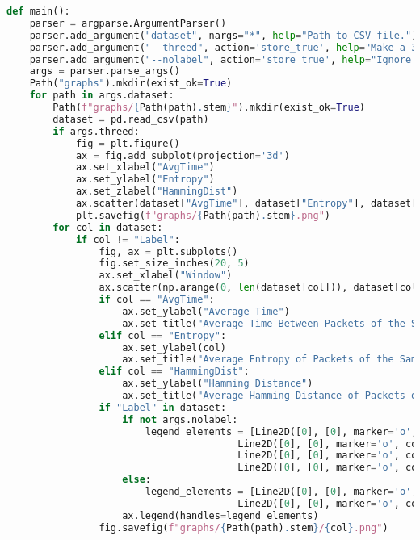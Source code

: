 \begin{lstlisting}[language=Python]
def main():
    parser = argparse.ArgumentParser()
    parser.add_argument("dataset", nargs="*", help="Path to CSV file.")
    parser.add_argument("--threed", action='store_true', help="Make a 3d scatterplot.")
    parser.add_argument("--nolabel", action='store_true', help="Ignore labels.")
    args = parser.parse_args()
    Path("graphs").mkdir(exist_ok=True)
    for path in args.dataset:
        Path(f"graphs/{Path(path).stem}").mkdir(exist_ok=True)
        dataset = pd.read_csv(path)
        if args.threed:
            fig = plt.figure()
            ax = fig.add_subplot(projection='3d')
            ax.set_xlabel("AvgTime")
            ax.set_ylabel("Entropy")
            ax.set_zlabel("HammingDist")
            ax.scatter(dataset["AvgTime"], dataset["Entropy"], dataset["HammingDist"], c = dataset["Label"].apply(label_to_color_alt if args.nolabel else label_to_color).values if "Label" in dataset else "c")
            plt.savefig(f"graphs/{Path(path).stem}.png")
        for col in dataset:
            if col != "Label":
                fig, ax = plt.subplots()
                fig.set_size_inches(20, 5)
                ax.set_xlabel("Window")
                ax.scatter(np.arange(0, len(dataset[col])), dataset[col], c = dataset["Label"].apply(label_to_color_alt if args.nolabel else label_to_color).values if "Label" in dataset else "c")
                if col == "AvgTime":
                    ax.set_ylabel("Average Time")
                    ax.set_title("Average Time Between Packets of the Same ID")
                elif col == "Entropy":
                    ax.set_ylabel(col)
                    ax.set_title("Average Entropy of Packets of the Same ID")
                elif col == "HammingDist":
                    ax.set_ylabel("Hamming Distance")
                    ax.set_title("Average Hamming Distance of Packets of the Same ID")
                if "Label" in dataset:
                    if not args.nolabel:
                        legend_elements = [Line2D([0], [0], marker='o', color='w', label='True positive', markerfacecolor='g', markersize=15),
                                        Line2D([0], [0], marker='o', color='w', label='True negative', markerfacecolor='b', markersize=15),
                                        Line2D([0], [0], marker='o', color='w', label='False positive', markerfacecolor='y', markersize=15),
                                        Line2D([0], [0], marker='o', color='w', label='False negative', markerfacecolor='r', markersize=15)]
                    else:
                        legend_elements = [Line2D([0], [0], marker='o', color='w', label='Alert', markerfacecolor='g', markersize=15),
                                        Line2D([0], [0], marker='o', color='w', label='No alert', markerfacecolor='b', markersize=15)]
                    ax.legend(handles=legend_elements)
                fig.savefig(f"graphs/{Path(path).stem}/{col}.png")
\end{lstlisting}

